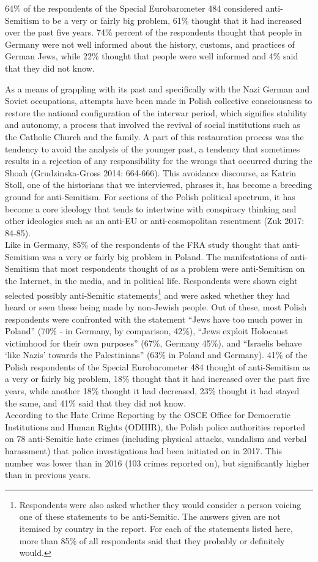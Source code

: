 64\% of the respondents of the Special Eurobarometer 484 considered anti-Semitism to be a very or fairly big problem, 61\% thought that it had increased over the past five years. 74\% percent of the respondents thought that people in Germany were not well informed about the history, customs, and practices of German Jews, while 22\% thought that people were well informed and 4\% said that they did not know. \par
As a means of grappling with its past and specifically with the Nazi German and Soviet occupations, attempts have been made in Polish collective consciousness to restore the national configuration of the interwar period, which signifies stability and autonomy, a process that involved the revival of social institutions such as the Catholic Church and the family. A part of this restauration process was the tendency to avoid the analysis of the younger past, a tendency that sometimes results in a rejection of any responsibility for the wrongs that occurred during the Shoah (Grudzinska-Gross 2014: 664-666). This avoidance discourse, as Katrin Stoll, one of the historians that we interviewed, phrases it, has become a breeding ground for anti-Semitism. For sections of the Polish political spectrum, it has become a core ideology that tends to intertwine with conspiracy thinking and other ideologies such as an anti-EU or anti-cosmopolitan resentment (Zuk 2017: 84-85). \\
Like in Germany, 85\% of the respondents of the FRA study thought that anti-Semitism was a very or fairly big problem in Poland. The manifestations of anti-Semitism that most respondents thought of as a problem were anti-Semitism on the Internet, in the media, and in political life. Respondents were shown eight selected possibly anti-Semitic statements\footnote{Respondents were also asked whether they would consider a person voicing one of these statements to be anti-Semitic. The answers given are not itemised by country in the report. For each of the statements listed here, more than 85\% of all respondents said that they probably or definitely would.} and were asked whether they had heard or seen these being made by non-Jewish people. Out of these, most Polish respondents were confronted with the statement ``Jews have too much power in Poland'' (70\% - in Germany, by comparison, 42\%), ``Jews exploit Holocaust victimhood for their own purposes'' (67\%, Germany 45\%), and ``Israelis behave `like Nazis' towards the Palestinians'' (63\% in Poland and Germany). 41\% of the Polish respondents of the Special Eurobarometer 484 thought of anti-Semitism as a very or fairly big problem, 18\% thought that it had increased over the past five years, while another 18\% thought it had decreased, 23\% thought it had stayed the same, and 41\% said that they did not know.\\ According to the Hate Crime Reporting by the OSCE Office for Democratic Institutions and Human Rights (ODIHR), the Polish police authorities reported on 78 anti-Semitic hate crimes (including physical attacks, vandalism and verbal harassment) that police investigations had been initiated on in 2017. This number was lower than in 2016 (103 crimes reported on), but significantly higher than in previous years. 
